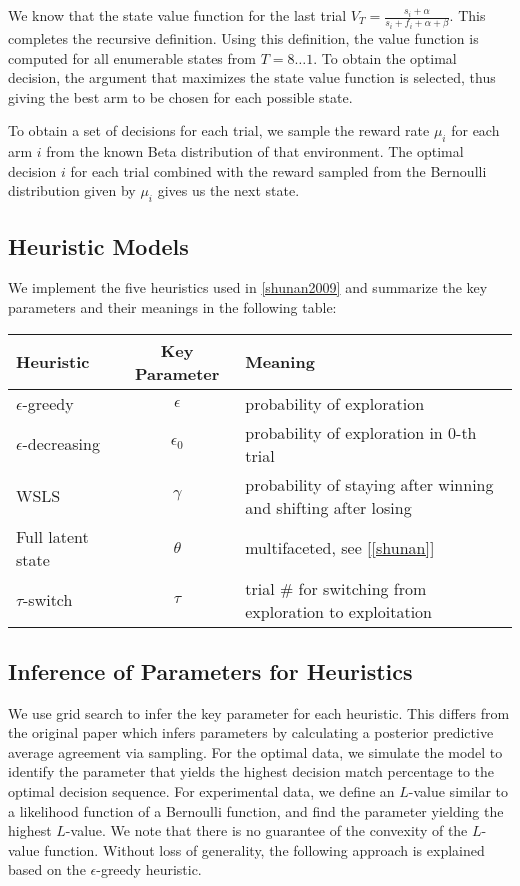 We know that the state value function for the last trial $V_T=\frac{s_i + \alpha}{s_i + f_i + \alpha + \beta}$. This completes the recursive definition. Using this definition, the value function is computed for all enumerable states from $T=8\ldots1$. To obtain the optimal decision, the argument that maximizes the state value function is selected, thus giving the best arm to be chosen for each possible state. 

To obtain a set of decisions for each trial, we sample the reward rate $\mu_i$ for each arm $i$ from the known Beta distribution of that environment. The optimal decision $i$ for each trial combined with the reward sampled from the Bernoulli distribution given by $\mu_i$ gives us the next state.

\subsection{Heuristic Models}
We implement the five heuristics used in \ref{shunan2009} and summarize the key parameters and their meanings in the following table: 

\begin{table}[h]
\begin{tabular}{|l|c|l|}
\hline
\textbf{Heuristic} & \textbf{Key Parameter} & \textbf{Meaning} \\ \hline
$\epsilon$-greedy & $\epsilon$ & probability of exploration \\ \hline
$\epsilon$-decreasing & $\epsilon_0$ & probability of exploration in 0-th trial \\ \hline
WSLS & $\gamma$ & probability of staying after winning and shifting after losing \\ \hline
Full latent state & $\theta$ & multifaceted, see [\ref{shunan}] \\ \hline
$\tau$-switch & $\tau$ & trial \# for switching from exploration to exploitation \\ \hline
\end{tabular}
\end{table}

\subsection{Inference of Parameters for Heuristics}
We use grid search to infer the key parameter for each heuristic. This differs from the original paper which infers parameters by calculating a posterior predictive average agreement via sampling. For the optimal data, we simulate the model to identify the parameter that yields the highest decision match percentage to the optimal decision sequence. For experimental data, we define an $L$-value similar to a likelihood function of a Bernoulli function, and find the parameter yielding the highest $L$-value. We note that there is no guarantee of the convexity of the $L$-value function. Without loss of generality, the following approach is explained based on the $\epsilon$-greedy heuristic. 

